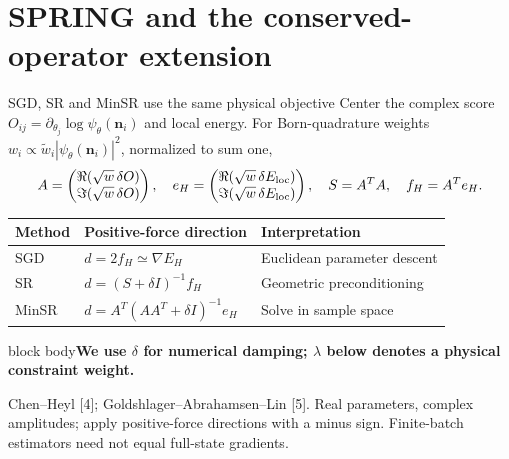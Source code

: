 \documentclass[aspectratio=169,10pt]{beamer}
\newcommand{\src}[1]{\vfill{\fontsize{6.3}{7.5}\selectfont\color{muted}#1\par}}
\newcommand{\take}[1]{\vspace{1mm}\begin{beamercolorbox}[sep=1.6mm,wd=\textwidth]{block body}\small\color{teal}\textbf{#1}\end{beamercolorbox}}
\newcommand{\nn}{\mathbf n}
\begin{document}
\section{SPRING and the conserved-operator extension}
\begin{frame}{SGD, SR and MinSR use the same physical objective}
\small Center the complex score $O_{ij}=\partial_{\theta_j}\log\psi_\theta(\nn_i)$ and local energy. For Born-quadrature weights $w_i\propto\widetilde w_i|\psi_\theta(\nn_i)|^2$, normalized to sum one,
\[
A=\begin{pmatrix}\Re(\sqrt w\,\delta O)\\ \Im(\sqrt w\,\delta O)\end{pmatrix},
\quad
e_H=\begin{pmatrix}\Re(\sqrt w\,\delta E_{\rm loc})\\ \Im(\sqrt w\,\delta E_{\rm loc})\end{pmatrix},
\quad S=A^TA,\quad f_H=A^Te_H.
\]
\renewcommand{\arraystretch}{1.35}
\begin{tabular}{@{}L{.14\textwidth}L{.46\textwidth}L{.31\textwidth}@{}}
\toprule
Method & Positive-force direction & Interpretation\\\midrule
SGD & $d=2f_H\simeq\nabla E_H$ & Euclidean parameter descent\\
SR & $d=(S+\delta I)^{-1}f_H$ & Geometric preconditioning\\
MinSR & $d=A^T(AA^T+\delta I)^{-1}e_H$ & Solve in sample space\\\bottomrule
\end{tabular}
\take{We use $\delta$ for numerical damping; $\lambda$ below denotes a physical constraint weight.}
\src{Chen--Heyl [4]; Goldshlager--Abrahamsen--Lin [5]. Real parameters, complex amplitudes; apply positive-force directions with a minus sign. Finite-batch estimators need not equal full-state gradients.}
\end{frame}
\end{document}
